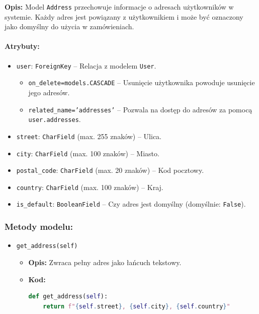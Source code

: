 \documentclass[12pt,a4paper,oneside]{article}
\theoremstyle{definition}
\numberwithin{equation}{section}
\begin{document}
\textbf{Opis:}  
Model \texttt{Address} przechowuje informacje o adresach użytkowników w systemie. Każdy adres jest powiązany z użytkownikiem i może być oznaczony jako domyślny do użycia w zamówieniach.

\paragraph{Atrybuty:}
\begin{itemize}
    \item \texttt{user}: \texttt{ForeignKey} – Relacja z modelem \texttt{User}.
    \begin{itemize}
        \item \texttt{on\_delete=models.CASCADE} – Usunięcie użytkownika powoduje usunięcie jego adresów.
        \item \texttt{related\_name='addresses'} – Pozwala na dostęp do adresów za pomocą \texttt{user.addresses}.
    \end{itemize}
    \item \texttt{street}: \texttt{CharField} (max. 255 znaków) – Ulica.
    \item \texttt{city}: \texttt{CharField} (max. 100 znaków) – Miasto.
    \item \texttt{postal\_code}: \texttt{CharField} (max. 20 znaków) – Kod pocztowy.
    \item \texttt{country}: \texttt{CharField} (max. 100 znaków) – Kraj.
    \item \texttt{is\_default}: \texttt{BooleanField} – Czy adres jest domyślny (domyślnie: \texttt{False}).
\end{itemize}

\subsubsection{Metody modelu:}
\begin{itemize}
    \item \texttt{get\_address(self)}  
        \begin{itemize}
            \item \textbf{Opis:} Zwraca pełny adres jako łańcuch tekstowy.
            \item \textbf{Kod:}
            \begin{lstlisting}[language=Python, caption=Metoda \texttt{get\_address}]
def get_address(self):
    return f"{self.street}, {self.city}, {self.country}"
            \end{lstlisting}
        \end{itemize}
\end{itemize}
\end{document}
